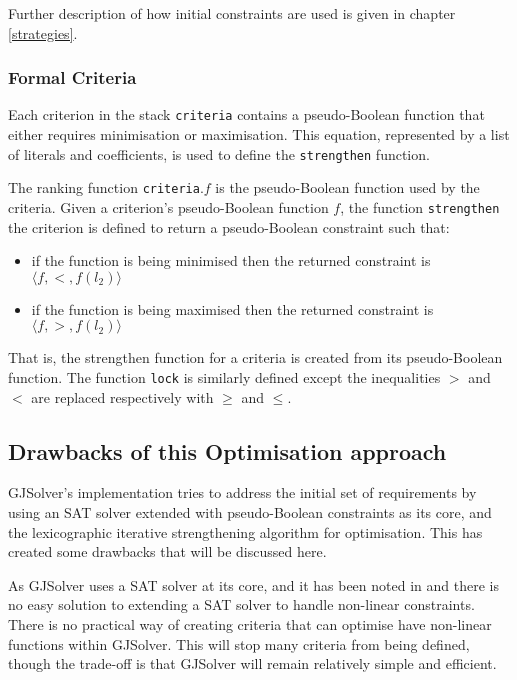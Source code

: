 Further description of how initial constraints are used is given in chapter \ref{strategies}. 

\subsubsection{Formal Criteria}
Each criterion in the stack \verb+criteria+ contains a pseudo-Boolean function that either requires minimisation or maximisation.
This equation, represented by a list of literals and coefficients, is used to define the \verb+strengthen+ function.

The ranking function \verb+criteria+.$f$ is the pseudo-Boolean function used by the criteria.
Given a criterion's pseudo-Boolean function $f$,
the function \verb+strengthen+ the criterion is defined to return a pseudo-Boolean constraint such that:
\begin{itemize}
  \item if the function is being minimised then the returned constraint is $\langle f,<,f(l_2) \rangle$
  \item if the function is being maximised then the returned constraint is $\langle f,>,f(l_2) \rangle$
\end{itemize}
That is, the strengthen function for a criteria is created from its pseudo-Boolean function.
The function \verb+lock+ is similarly defined except the inequalities $>$ and $<$ are replaced respectively with $\geq$ and $\leq$.

\subsection{Drawbacks of this Optimisation approach}
GJSolver's implementation tries to address the initial set of requirements by using an SAT solver extended with pseudo-Boolean constraints as its core,
and the lexicographic iterative strengthening algorithm for optimisation.
This has created some drawbacks that will be discussed here.

As GJSolver uses a SAT solver at its core, 
and it has been noted in \citep{le_berre_dependency_2009} and \citep{leBerre2010} there is no easy solution to extending a SAT solver to handle non-linear constraints.
There is no practical way of creating criteria that can optimise have non-linear functions within GJSolver.
This will stop many criteria from being defined, though the trade-off is that GJSolver will remain relatively simple and efficient.

